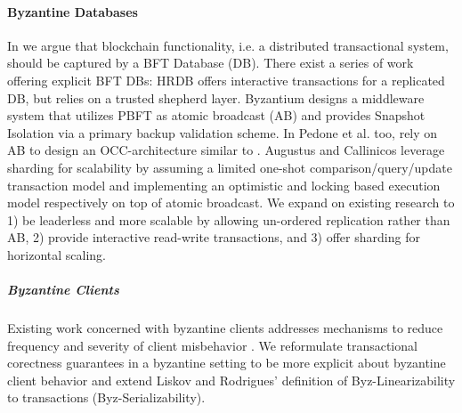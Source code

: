 \paragraph{Byzantine Databases}
In \sys we argue that blockchain functionality, i.e. a distributed transactional system, should be captured by a BFT Database (DB). There exist a series of work offering explicit BFT DBs: HRDB \cite{vandiver2007tolerating} offers interactive transactions for a replicated DB, but relies on a trusted shepherd layer. Byzantium \cite{garcia2011efficient} designs a middleware system that utilizes PBFT as atomic broadcast (AB) and provides Snapshot Isolation via a primary backup validation scheme. In \cite{pedone2012byzantine} Pedone et al. too, rely on AB to design an OCC-architecture similar to \sys. Augustus \cite{padilha2013augustus} and Callinicos \cite{padilha2016callinicos} leverage sharding for scalability by assuming a limited one-shot comparison/query/update transaction model and implementing an optimistic and locking based execution model respectively on top of atomic broadcast.
We expand on existing research to 1) be leaderless and more scalable by allowing un-ordered replication rather than AB, 2) provide interactive read-write transactions, and 3) offer sharding for horizontal scaling.
\subparagraph{Byzantine Clients}
Existing work concerned with byzantine clients addresses mechanisms to reduce frequency and severity of client misbehavior \cite{liskov2006tolerating, garcia2011efficient, pedone2012byzantine, padilha2013augustus, padilha2016callinicos, luiz2011byzantine, }. We reformulate transactional corectness guarantees in a byzantine setting to be more explicit about byzantine client behavior  and extend Liskov and Rodrigues' \cite{liskov2006tolerating} definition of Byz-Linearizability to transactions (Byz-Serializability). 

















